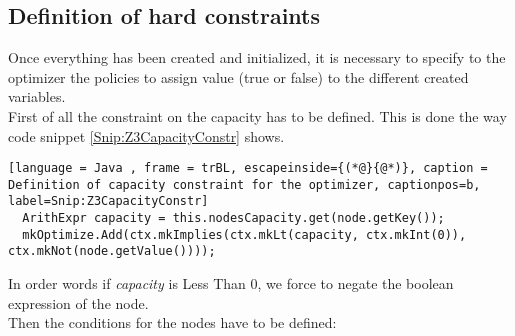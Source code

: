 \subsection{Definition of hard constraints}
Once everything has been created and initialized, it is necessary to specify to the optimizer the policies to assign value (true or false) to the different created variables.\\
First of all the constraint on the capacity has to be defined. This is done the way code snippet \ref{Snip:Z3CapacityConstr} shows.
\begin{lstlisting}[language = Java , frame = trBL, escapeinside={(*@}{@*)}, caption = Definition of capacity constraint for the optimizer, captionpos=b, label=Snip:Z3CapacityConstr]
  ArithExpr capacity = this.nodesCapacity.get(node.getKey());
  mkOptimize.Add(ctx.mkImplies(ctx.mkLt(capacity, ctx.mkInt(0)), ctx.mkNot(node.getValue())));
\end{lstlisting}
In order words if \textit{capacity} is Less Than 0, we force to negate the boolean expression of the node.\\
Then the conditions for the nodes have to be defined:
